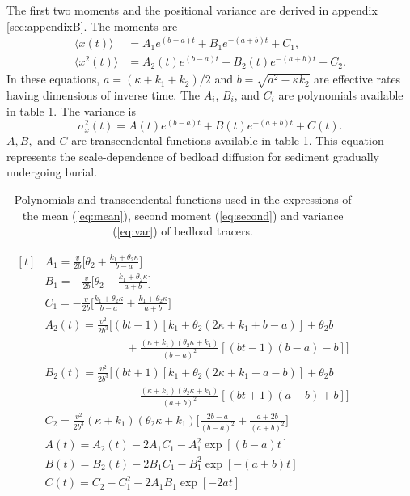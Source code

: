 \documentclass[]{agujournal2018}
\newcommand\be{\begin{equation}}
\newcommand\ee{\end{equation}}
\newcommand\bra{\langle}
\newcommand\ket{\rangle}
\begin{document}
 The first two moments and the positional variance are derived in appendix \ref{sec:appendixB}.
The moments are
\begin{align}
\bra x(t) \ket &= A_1 e^{(b-a)t}+B_1e^{-(a+b)t}+C_1, \label{eq:mean}\\
\bra x^2(t) \ket &= A_2(t)e^{(b-a)t}+B_2(t)e^{-(a+b)t}+C_2. \label{eq:second}
\end{align}
In these equations, $a = (\kappa + k_1+k_2)/2$ and $b = \sqrt{a^2-\kappa k_2}$ are effective rates having dimensions of inverse time.
The $A_i$, $B_i$, and $C_i$ are polynomials available in table \ref{table:params}.
The variance is
\be \sigma_x^2(t) = A(t)e^{(b-a)t} + B(t)e^{-(a+b)t} + C(t). \label{eq:var}\ee
$A, B,$ and $C$ are transcendental functions available in table \ref{table:params}.
This equation represents the scale-dependence of bedload diffusion for sediment gradually undergoing burial.
\begin{table}[!h]
	\centering
	\caption{Polynomials and transcendental functions used in the expressions of the mean (\ref{eq:mean}), second moment (\ref{eq:second}) and variance (\ref{eq:var}) of bedload tracers.}
	\label{table:params}
	\begin{tabular}{c}
		\toprule
		$\begin{aligned}[t]
		&A_1 = \frac{v}{2b}\big[\theta_2+\frac{k_1+\theta_2\kappa}{b-a}\big] \\
		&B_1 = -\frac{v}{2b}\big[\theta_2-\frac{k_1+\theta_2 \kappa}{a+b}\big] \\
		&C_1 =  -\frac{v}{2b}\big[\frac{k_1+\theta_2 \kappa}{b-a}+\frac{k_1+\theta_2 \kappa}{a+b}\big]\\
		&A_2(t) = \frac{v^2}{2b^3}\Big[(bt-1)[k_1+\theta_2(2\kappa + k_1 + b-a)]+\theta_2b \\
		&\hspace{3cm} + \frac{(\kappa+k_1)(\theta_2\kappa+k_1)}{(b-a)^2}[(bt-1)(b-a)-b]\Big]\\
		&B_2(t) = \frac{v^2}{2b^3}\Big[(bt+1)[k_1 + \theta_2(2\kappa+k_1-a-b)]+\theta_2b\\
		&\hspace{3cm} -\frac{(\kappa+k_1)(\theta_2\kappa+k_1)}{(a+b)^2}[(bt+1)(a+b)+b]\Big]\\
		&C_2 = \frac{v^2}{2b^3}(\kappa+k_1)(\theta_2 \kappa + k_1)\Big[\frac{2b-a}{(b-a)^2}+\frac{a+2b}{(a+b)^2}\Big]\\
		&A(t) = A_2(t)-2A_1C_1 - A_1^2\exp[(b-a)t]\\
		&B(t) = B_2(t)-2B_1C_1 - B_1^2\exp[-(a+b)t]\\
		&C(t) = C_2-C_1^2-2A_1B_1\exp[-2at]\\			
		\end{aligned}$\\
		\bottomrule
	\end{tabular}
\end{table}
\end{document}

